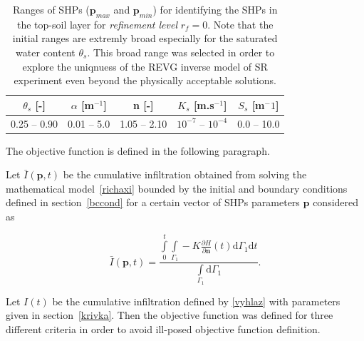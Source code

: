 \documentclass[review]{elsarticle}
\newenvironment{lineq}
    {\begin{linenomath*}
    \begin{equation}
    }
    { 
    \end{equation} 
    \end{linenomath*}
    }
\newcommand{\dd}{\mathrm{d}}
\renewcommand{\vec}{\mathbf}
\begin{document}
\begin{table}[ht]
\begin{center}
\caption{Ranges of SHPs ($\vec{p}_{max}$ and $\vec{p}_{min}$) for identifying the SHPs in the top-soil layer for {\it refinement level} $r_f=0$. Note that the initial ranges are extremly broad especially for the saturated water content $\theta_s$. This broad range was selected in order to explore the uniqnuess
of the REVG inverse model of SR experiment
 even beyond the physically acceptable solutions. }
\begin{small}
\doublespacing
\begin{tabular}{c c c c c}
\toprule
$\theta_s$ [-]&$\alpha$ [m$^{-1}$]&n [-]& $K_s$ [m.s$^{-1}$] & $S_s$ [m$^-1$] \\ \hline
\toprule
0.25 -- 0.90 & 0.01 -- 5.0 & 1.05 -- 2.10 & $10^{-7}$ -- $10^{-4}$ & 0.0 -- 10.0 \\
\toprule
\end{tabular}
\end{small}
\label{rozsahy}
\end{center}
\end{table}

The objective function is defined in the following paragraph.


Let $\bar{I}(\vec{p},t)$ be the cumulative infiltration obtained from solving the mathematical model~\eqref{richaxi} bounded by the initial and boundary conditions  defined in section~\ref{bccond} for a certain vector of SHPs parameters $\vec{p}$ considered as
\begin{lineq}\bar{I}(\vec{p},t) = \frac{\int\limits_0^t \int\limits_{\Gamma_1}-K \frac{\partial H}{\partial \vec{n}}(t)  \dd \Gamma_1 \dd t}{\int\limits_{\Gamma_1} \dd \Gamma_1}.\end{lineq}
Let $I(t)$ be the cumulative infiltration defined by \eqref{vyhlaz} with parameters given in section~\ref{krivka}. 
Then the objective function was defined for three different criteria in order to avoid ill-posed objective function definition.
\end{document}
